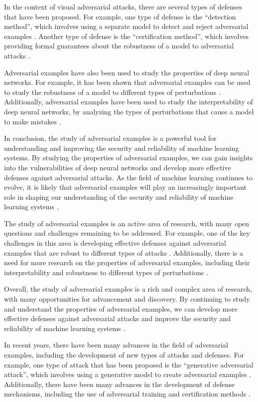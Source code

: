 \documentclass[11pt]{article}
\begin{document}
In the context of visual adversarial attacks, there are several types of defenses that have been proposed. For example, one type of defense is the ``detection method'', which involves using a separate model to detect and reject adversarial examples \cite{ref25}. Another type of defense is the ``certification method'', which involves providing formal guarantees about the robustness of a model to adversarial attacks \cite{ref26}.

Adversarial examples have also been used to study the properties of deep neural networks. For example, it has been shown that adversarial examples can be used to study the robustness of a model to different types of perturbations \cite{ref23}. Additionally, adversarial examples have been used to study the interpretability of deep neural networks, by analyzing the types of perturbations that cause a model to make mistakes \cite{ref28}.

In conclusion, the study of adversarial examples is a powerful tool for understanding and improving the security and reliability of machine learning systems. By studying the properties of adversarial examples, we can gain insights into the vulnerabilities of deep neural networks and develop more effective defenses against adversarial attacks. As the field of machine learning continues to evolve, it is likely that adversarial examples will play an increasingly important role in shaping our understanding of the security and reliability of machine learning systems \cite{ref29}.

The study of adversarial examples is an active area of research, with many open questions and challenges remaining to be addressed. For example, one of the key challenges in this area is developing effective defenses against adversarial examples that are robust to different types of attacks \cite{ref30}. Additionally, there is a need for more research on the properties of adversarial examples, including their interpretability and robustness to different types of perturbations \cite{ref23}.

Overall, the study of adversarial examples is a rich and complex area of research, with many opportunities for advancement and discovery. By continuing to study and understand the properties of adversarial examples, we can develop more effective defenses against adversarial attacks and improve the security and reliability of machine learning systems \cite{ref31}.

In recent years, there have been many advances in the field of adversarial examples, including the development of new types of attacks and defenses. For example, one type of attack that has been proposed is the ``generative adversarial attack'', which involves using a generative model to create adversarial examples \cite{ref32}. Additionally, there have been many advances in the development of defense mechanisms, including the use of adversarial training and certification methods \cite{ref26}.
\end{document}
